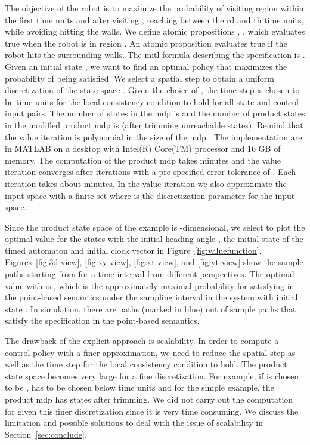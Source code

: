 \documentclass[letterpaper, 10 pt, conference]{ieeeconf}
\begin{document}
The objective of the robot is to maximize the probability of visiting
region  within the first  time units and after visiting ,
reaching  between the rd and th time units, while avoiding
hitting the walls. We define atomic propositions , ,
which evaluates true when the robot is in region . An atomic
proposition  evaluates true if the robot hits the surrounding
walls.  The \ac{mitl} formula describing the specification is
.
Given an initial state , we want to find an optimal policy
that maximizes the probability of  being satisfied. We select
a spatial step  to obtain a uniform
discretization of the state space . Given the choice of , the
time step  is chosen to be  time units for the local
consistency condition to hold for all state and control input
pairs. The number of states in the \ac{mdp}  is  and the
number of product states in the modified product \ac{mdp}
 is  (after trimming unreachable states). Remind
that the value iteration is polynomial in the size of the \ac{mdp}
.  The implementation are in
MATLAB\textsuperscript{\textregistered} on a desktop with Intel(R)
Core(TM) processor and 16 GB of memory. The computation of the product
\ac{mdp} takes  minutes and the value iteration converges after
 iterations with a pre-specified error tolerance of . Each
iteration takes about  minutes. In the value iteration we also
approximate the input space  with a finite set  where
 is the discretization parameter for the input space.




Since the product state space of the example is -dimensional, we
select to plot the optimal value  for the states with the initial
heading angle , the initial state of the timed automaton
and initial clock vector  in
Figure~\ref{fig:valuefunction}. Figures~\ref{fig:3d-view},
\ref{fig:xy-view}, \ref{fig:xt-view}, and \ref{fig:yt-view} show the
sample paths starting from  for a time interval
 from different perspectives. The optimal value  with
 is , which is the approximately
maximal probability for satisfying  in the point-based
semantics under the sampling interval  in the system with initial
state . In simulation, there are  paths
(marked in blue) out of  sample paths that satisfy the
specification in the point-based semantics. 





The drawback of the explicit approach is scalability. In order to
compute a control policy with a finer approximation, we need to reduce
the spatial step  as well as the time step  for the local
consistency condition to hold. The product state space becomes very
large for a fine discretization. For example, if  is chosen to be
,  has to be chosen below  time units
and for the simple example, the product \ac{mdp} has  states
after trimming. We did not carry out the computation for  given
this finer discretization since it is very time consuming. We discuss
the limitation and possible solutions to deal with the issue of
scalability in Section~\ref{sec:conclude}. 
\end{document}
